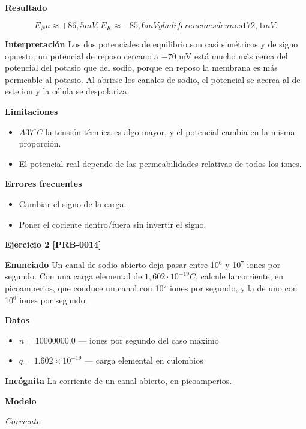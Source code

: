 \documentclass{book}
\begin{document}
\noindent\textbf{Resultado}

\[
E_Na \approx +86,5 mV, E_K \approx -85,6 mV y la diferencia es de unos 172,1 mV.
\]

\noindent\textbf{Interpretación}
Los dos potenciales de equilibrio son casi simétricos y de signo opuesto; un potencial de reposo cercano a \(-70\) mV está mucho más cerca del potencial del potasio que del sodio, porque en reposo la membrana es más permeable al potasio. Al abrirse los canales de sodio, el potencial se acerca al de este ion y la célula se despolariza.


\noindent\textbf{Limitaciones}
\begin{itemize}
\item \(A 37 ^{\circ}C\) la tensión térmica es algo mayor, y el potencial cambia en la misma proporción.
\item El potencial real depende de las permeabilidades relativas de todos los iones.
\end{itemize}

\noindent\textbf{Errores frecuentes}
\begin{itemize}
\item Cambiar el signo de la carga.
\item Poner el cociente dentro/fuera sin invertir el signo.
\end{itemize}

\noindent\textbf{Ejercicio 2 [PRB-0014]}

\noindent\textbf{Enunciado}
Un canal de sodio abierto deja pasar entre 10\({}^{6}\) y 10\({}^{7}\) iones por segundo. Con una carga elemental de \(1,602\cdot10^{-19} C\), calcule la corriente, en picoamperios, que conduce un canal con 10\({}^{7}\) iones por segundo, y la de uno con 10\({}^{6}\) iones por segundo.


\noindent\textbf{Datos}
\begin{itemize}
\item $n = 10000000.0$ — iones por segundo del caso máximo
\item $q = 1.602\times 10^{-19}$ — carga elemental en culombios
\end{itemize}

\noindent\textbf{Incógnita}
La corriente de un canal abierto, en picoamperios.


\noindent\textbf{Modelo}

\noindent\textit{Corriente}
\end{document}
